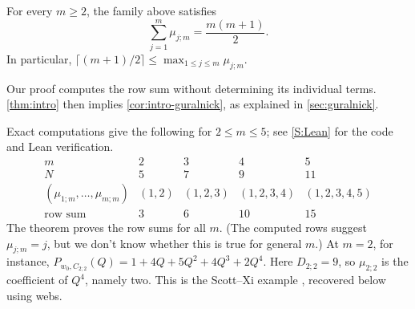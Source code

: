 \documentclass[a4paper,11pt]{amsart}
\numberwithin{equation}{subsection}
\theoremstyle{plain}
\theoremstyle{definition}
\theoremstyle{remark}
\begin{document}
\begin{theorem}\label{thm:intro}
For every $m\ge2$, the family above satisfies
\[
\sum_{j=1}^{m}\mu_{j;m}=\frac{m(m+1)}{2}.
\]
In particular, $\lceil(m+1)/2\rceil\leq\max_{1\le j\le m}\mu_{j;m}$.
\end{theorem}

Our proof computes the row sum without determining its individual terms. 
\autoref{thm:intro} then implies \autoref{cor:intro-guralnick}, as explained in \autoref{sec:guralnick}.

Exact computations give the following
for $2\le m\le5$; see \autoref{S:Lean} for the code and Lean verification.
\[
\begin{array}{c|cccc}
m&2&3&4&5\\\hline
N&5&7&9&11\\
(\mu_{1;m},\ldots,\mu_{m;m})&(1,2)&(1,2,3)&(1,2,3,4)&(1,2,3,4,5)\\
\text{row sum}&3&6&10&15
\end{array}
\]
The theorem proves the row sums for all $m$. (The computed rows
suggest $\mu_{j;m}=j$, but we don't know whether this is true for general $m$.) At $m=2$, for instance, $P_{w_0,C_{2;2}}(Q)=1+4Q+5Q^2+4Q^3+2Q^4$.
Here $D_{2;2}=9$, so $\mu_{2;2}$ is the coefficient of $Q^4$,
namely two. This is the Scott--Xi example
\cite[Lemma~3.4]{SX}, recovered below using webs.
\end{document}
